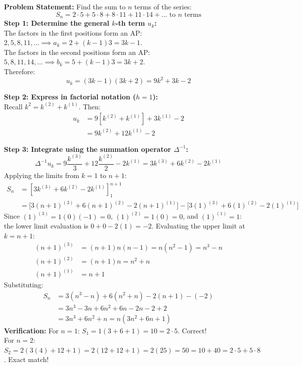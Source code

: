 \begin{examplebox}
\textbf{Problem Statement:} Find the sum to $n$ terms of the series:
\begin{equation}
    S_n = 2 \cdot 5 + 5 \cdot 8 + 8 \cdot 11 + 11 \cdot 14 + \dots \text{ to } n \text{ terms}
\end{equation}
\textbf{Step 1: Determine the general $k$-th term $u_k$:} \\
The factors in the first positions form an AP: $2, 5, 8, 11, \dots \implies a_k = 2 + (k - 1)3 = 3k - 1$. \\
The factors in the second positions form an AP: $5, 8, 11, 14, \dots \implies b_k = 5 + (k - 1)3 = 3k + 2$. \\
Therefore:
\begin{equation}
    u_k = (3k - 1)(3k + 2) = 9k^2 + 3k - 2
\end{equation}

\textbf{Step 2: Express in factorial notation ($h = 1$):} \\
Recall $k^2 = k^{(2)} + k^{(1)}$. Then:
\begin{align}
    u_k &= 9\left[ k^{(2)} + k^{(1)} \right] + 3 k^{(1)} - 2 \nonumber \\
    &= 9 k^{(2)} + 12 k^{(1)} - 2
\end{align}

\textbf{Step 3: Integrate using the summation operator $\Delta^{-1}$:} \\
\begin{equation}
    \Delta^{-1} u_k = 9 \frac{k^{(3)}}{3} + 12 \frac{k^{(2)}}{2} - 2 k^{(1)} = 3 k^{(3)} + 6 k^{(2)} - 2 k^{(1)}
\end{equation}
Applying the limits from $k = 1$ to $n + 1$:
\begin{align}
    S_n &= \left[ 3 k^{(3)} + 6 k^{(2)} - 2 k^{(1)} \right]_1^{n+1} \nonumber \\
    &= \Big[ 3 (n+1)^{(3)} + 6 (n+1)^{(2)} - 2 (n+1)^{(1)} \Big] - \Big[ 3(1)^{(3)} + 6(1)^{(2)} - 2(1)^{(1)} \Big]
\end{align}
Since $(1)^{(3)} = 1(0)(-1) = 0$, $(1)^{(2)} = 1(0) = 0$, and $(1)^{(1)} = 1$:
the lower limit evaluation is $0 + 0 - 2(1) = -2$.
Evaluating the upper limit at $k = n + 1$:
\begin{align}
    (n+1)^{(3)} &= (n+1)n(n-1) = n(n^2 - 1) = n^3 - n \\
    (n+1)^{(2)} &= (n+1)n = n^2 + n \\
    (n+1)^{(1)} &= n + 1
\end{align}
Substituting:
\begin{align}
    S_n &= 3(n^3 - n) + 6(n^2 + n) - 2(n + 1) - (-2) \nonumber \\
    &= 3n^3 - 3n + 6n^2 + 6n - 2n - 2 + 2 \nonumber \\
    &= 3n^3 + 6n^2 + n = \boxed{n\left( 3n^2 + 6n + 1 \right)}
\end{align}
\textbf{Verification:} For $n = 1$: $S_1 = 1(3 + 6 + 1) = 10 = 2 \cdot 5$. Correct! \\
For $n = 2$: $S_2 = 2(3(4) + 12 + 1) = 2(12 + 12 + 1) = 2(25) = 50 = 10 + 40 = 2\cdot 5 + 5 \cdot 8$. Exact match!
\end{examplebox}

